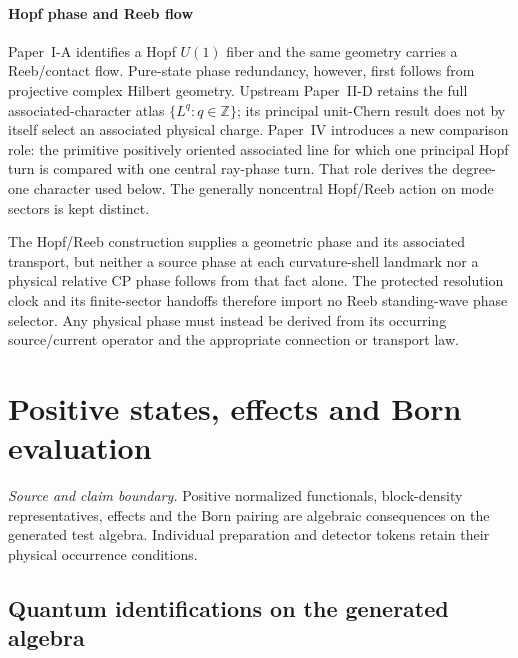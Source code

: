 \documentclass[12pt,a4paper]{article}
\begin{document}
\paragraph{Hopf phase and Reeb flow}
\label{p4:sec:part1-native-hopf}

Paper~I-A identifies a Hopf \(U(1)\) fiber and the same geometry carries a
Reeb/contact flow.  Pure-state phase redundancy, however, first follows from
projective complex Hilbert geometry.  Upstream Paper~II-D retains the full
associated-character atlas \(\{L^q:q\in\mathbb Z\}\); its principal
unit-Chern result does not by itself select an associated physical charge.
Paper~IV introduces a new comparison role: the primitive positively oriented
associated line for which one principal Hopf turn is compared with one central
ray-phase turn.  That role derives the degree-one character used below.  The
generally noncentral Hopf/Reeb action on mode sectors is kept distinct.


\begin{remark}
\label{p4:rem:reeb-geometry-no-shell-selector}
The Hopf/Reeb construction supplies a geometric phase and its associated
transport, but neither a source phase at each curvature-shell landmark nor a
physical relative CP phase follows from that fact alone.  The protected
resolution clock and its finite-sector handoffs therefore import no Reeb
standing-wave phase selector.  Any physical phase must instead be derived from
its occurring source/current operator and the appropriate connection or
transport law.
\end{remark}




\section{Positive states, effects and Born evaluation}
\label{p4a:sec:v238-a3}
\noindent\textit{Source and claim boundary.} Positive normalized functionals, block-density representatives, effects and the Born pairing are algebraic consequences on the generated test algebra. Individual preparation and detector tokens retain their physical occurrence conditions.

\subsection{Quantum identifications on the generated algebra}
\label{p4:sec:part1-selected}
\end{document}
